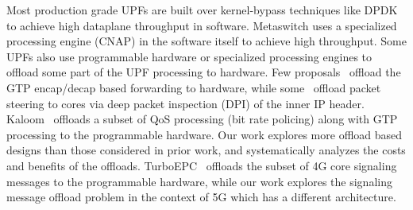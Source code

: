  Most production grade UPFs are built over kernel-bypass techniques like DPDK to achieve high dataplane throughput in software. Metaswitch \cite{metaswitch} uses a specialized processing engine (CNAP) in the software itself to achieve high throughput. Some UPFs also use programmable hardware or specialized processing engines to offload some part of the UPF processing to hardware. Few proposals~\cite{astri, mobile_5G_hw1, mobile_5G_hw2, mavenir} offload the GTP encap/decap based forwarding to hardware, while some~\cite{intel_wp} offload packet steering to cores via deep packet inspection (DPI) of the inner IP header. Kaloom~\cite{kaloom_wp} offloads a subset of QoS processing (bit rate policing) along with GTP processing to the programmable hardware. Our work explores more offload based designs than those considered in prior work, and systematically analyzes the costs and benefits of the offloads. TurboEPC~\cite{turboEPC} offloads the subset of 4G core signaling messages to the programmable hardware, while our work explores the signaling message offload problem in the context of 5G which has a different architecture. 

%

% 





